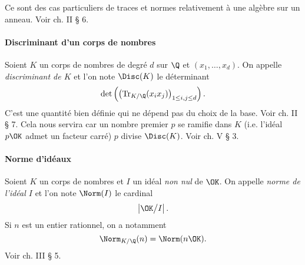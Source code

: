 	Ce sont des cas particuliers de traces et normes relativement à une algèbre sur un anneau. Voir \cite{Samuel} ch. II § 6.


\paragraph{Discriminant d'un corps de nombres} Soient $K$ un corps de nombres de degré $d$ sur $\Q$ et $(x_1, \dots, x_d)$. On appelle \emph{discriminant de $K$} et l'on note $\Disc(K)$ le déterminant \[\det\left(\left(\mathrm{Tr}_{K/\Q}(x_i x_j)\right)_{1\leq i, j \leq d}\right).\] C'est une quantité bien définie qui ne dépend pas du choix de la base. Voir \cite{Samuel} ch. II § 7. Cela nous servira car un nombre premier $p$ se ramifie dans $K$ (i.e. l'idéal $p\OK$ admet un facteur carré) \ssi $p$ divise $\Disc(K)$. Voir \cite{Samuel} ch. V § 3.

\paragraph{Norme d'idéaux} Soient $K$ un corps de nombres et $I$ un idéal \emph{non nul} de $\OK$. On appelle \emph{norme de l'idéal $I$} et l'on note $\Norm(I)$ le cardinal \[\left|\OK\big/I\right|.\] Si $n$ est un entier rationnel, on a notamment \[\Norm_{K/\Q}(n) = \Norm(n\OK).\] Voir \cite{Samuel} ch. III § 5.
